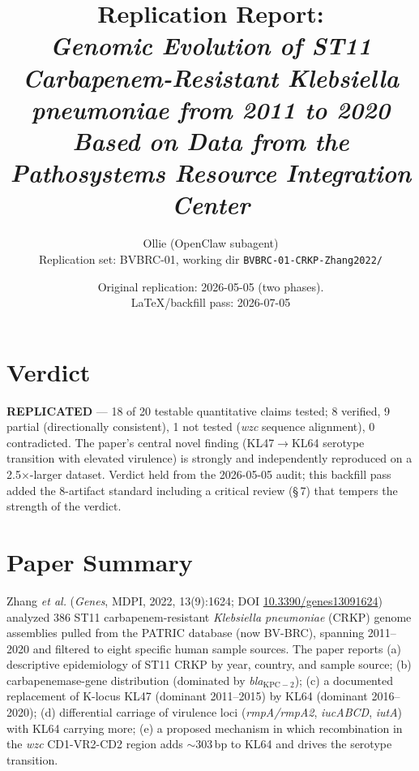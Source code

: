 \documentclass[11pt]{article}
\title{Replication Report: \\
\emph{Genomic Evolution of ST11 Carbapenem-Resistant Klebsiella pneumoniae from 2011 to 2020 Based on Data from the Pathosystems Resource Integration Center}}
\author{Ollie (OpenClaw subagent) \\
Replication set: BVBRC-01, working dir \texttt{BVBRC-01-CRKP-Zhang2022/}}
\date{Original replication: 2026-05-05 (two phases). \\
LaTeX/backfill pass: 2026-07-05}
\begin{document}
\maketitle

\section*{Verdict}
\textbf{REPLICATED} — 18 of 20 testable quantitative claims tested; 8 verified, 9 partial
(directionally consistent), 1 not tested (\emph{wzc} sequence alignment), 0 contradicted.
The paper's central novel finding (KL47$\rightarrow$KL64 serotype transition with elevated
virulence) is strongly and independently reproduced on a 2.5$\times$-larger dataset.
Verdict held from the 2026-05-05 audit; this backfill pass added the 8-artifact standard
including a critical review (\S\,7) that tempers the strength of the verdict.

\section{Paper Summary}
Zhang \emph{et al.} (\emph{Genes}, MDPI, 2022, 13(9):1624; DOI
\href{https://doi.org/10.3390/genes13091624}{10.3390/genes13091624}) analyzed 386 ST11
carbapenem-resistant \emph{Klebsiella pneumoniae} (CRKP) genome assemblies pulled from the
PATRIC database (now BV-BRC), spanning 2011--2020 and filtered to eight specific human
sample sources. The paper reports (a) descriptive epidemiology of ST11 CRKP by year,
country, and sample source; (b) carbapenemase-gene distribution (dominated by
\emph{bla}$_{\mathrm{KPC-2}}$); (c) a documented replacement of K-locus KL47 (dominant
2011--2015) by KL64 (dominant 2016--2020); (d) differential carriage of virulence loci
(\emph{rmpA/rmpA2}, \emph{iucABCD}, \emph{iutA}) with KL64 carrying more; (e) a proposed
mechanism in which recombination in the \emph{wzc} CD1-VR2-CD2 region adds
$\sim 303\,$bp to KL64 and drives the serotype transition.
\end{document}
